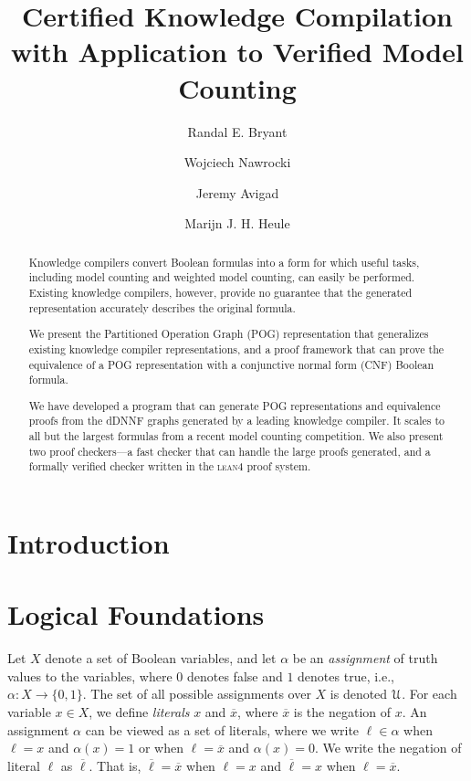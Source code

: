 \documentclass[letterpaper,USenglish,cleveref, autoref, thm-restate]{lipics-v2021}
\title{Certified Knowledge Compilation \\ with Application to Verified Model Counting}
\author{Randal E. Bryant}{Computer Science Department, Carnegie Mellon University, Pittsburgh, PA 15213 USA}{rebryant@cmu.edu}{https://orcid.org/0000-0001-5024-6613}{Supported by NSF grant CCF-2108521}
\author{Wojciech Nawrocki}{Department of Philosophy, Carnegie Mellon University}{wjnawrock@cmu.edu}{https://orcid.org/0000-0002-8839-0618}{}
\author{Jeremy Avigad}{Department of Philosophy, Carnegie Mellon University}{avigad@cmu.edu}{https://orcid.org/0000-0003-1275-315X}{}
\author{Marijn J. H. Heule}{Computer Science Department, Carnegie Mellon University}{marijn@cmu.edu}{https://orcid.org/0000-0002-5587-8801}{Supported by NSF grant CCF-2108521}
\newcommand{\obar}[1]{\overline{#1}}
\newcommand{\lit}{\ell}
\newcommand{\varset}{X}
\newcommand{\assign}{\alpha}
\newcommand{\uassign}{{\cal U}}
\newcommand{\program}[1]{\textsc{#1}}
\newcommand{\lean}{\program{lean4}}
\begin{document}
\maketitle

\begin{abstract}
Knowledge compilers convert Boolean formulas into a form for which
useful tasks, including model counting and weighted model counting,
can easily be performed.  Existing knowledge compilers, however,
provide no guarantee that the generated representation accurately
describes the original formula.

We present the Partitioned Operation Graph (POG) representation that
generalizes existing knowledge compiler representations, and a proof
framework that can prove the equivalence of a POG representation with
a conjunctive normal form (CNF) Boolean formula.

We have developed a program that can generate POG representations and
equivalence proofs from the dDNNF graphs generated by a leading
knowledge compiler.  It scales to all but the largest formulas from a
recent model counting competition.  We also present two proof
checkers---a fast checker that can handle the large proofs generated,
and a formally verified checker written in the \lean{} proof system.
\end{abstract}

\section{Introduction}

\section{Logical Foundations}

  Let $\varset$ denote a set of Boolean variables, and let $\assign$
  be an {\em assignment} of truth values to the variables, where $0$
  denotes false and $1$ denotes true, i.e., $\assign \colon \varset
  \rightarrow \{0,1\}$.  The set of all possible assignments over
  $\varset$ is denoted $\uassign$.  For each variable $x \in \varset$,
  we define {\em literals} $x$ and $\obar{x}$, where $\obar{x}$ is the
  negation of $x$. An
  assignment $\assign$ can be viewed as a set of literals, where
  we write $\lit \in \assign$ when $\lit = x$ and $\assign(x) = 1$ or when
  $\lit = \obar{x}$ and $\assign(x) = 0$.  We write the negation of literal $\lit$ as $\obar{\lit}$.  That is, $\obar{\lit} = \obar{x}$ when $\lit = x$ and
$\obar{\lit} = x$ when $\lit = \obar{x}$.
\end{document}
